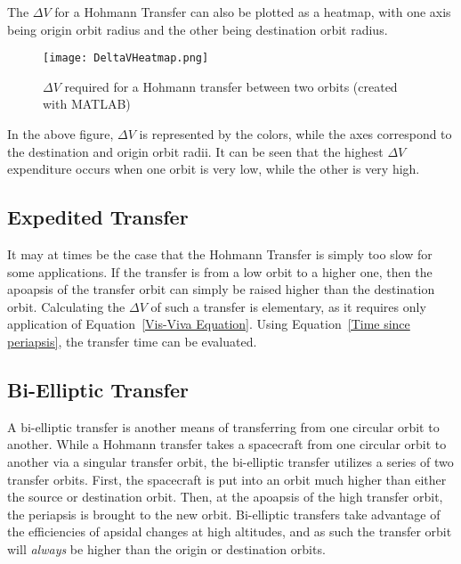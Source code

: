 \documentclass[../basicOrbitalDynamics.tex]{subfiles}
\begin{document}
The $\Delta V$ for a Hohmann Transfer can also be plotted as a heatmap, with one axis being origin orbit radius and the other being destination orbit radius.

\begin{figure}[H]
    \centering
    \texttt{[image: DeltaVHeatmap.png]}
    \caption{$\Delta V$ required for a Hohmann transfer between two orbits (created with MATLAB)}\label{fig:Delta V Heatmap}
\end{figure}

In the above figure, $\Delta V$ is represented by the colors, while the axes correspond to the destination and origin orbit radii. It can be seen that the highest $\Delta V$ expenditure occurs when one orbit is very low, while the other is very high.
\bigskip\bigskip
\subsection{Expedited Transfer}

It may at times be the case that the Hohmann Transfer is simply too slow for some applications. If the transfer is from a low orbit to a higher one, then the apoapsis of the transfer orbit can simply be raised higher than the destination orbit. Calculating the $\Delta V$ of such a transfer is elementary, as it requires only application of Equation~\eqref{Vis-Viva Equation}. Using Equation~\eqref{Time since periapsis}, the transfer time can be evaluated.

\bigskip\bigskip
\subsection{Bi-Elliptic Transfer}

A bi-elliptic transfer is another means of transferring from one circular orbit to another. While a Hohmann transfer takes a spacecraft from one circular orbit to another via a singular transfer orbit, the bi-elliptic transfer utilizes a series of two transfer orbits. First, the spacecraft is put into an orbit much higher than either the source or destination orbit. Then, at the apoapsis of the high transfer orbit, the periapsis is brought to the new orbit. Bi-elliptic transfers take advantage of the efficiencies of apsidal changes at high altitudes, and as such the transfer orbit will \textit{always} be higher than the origin or destination orbits.
\end{document}
